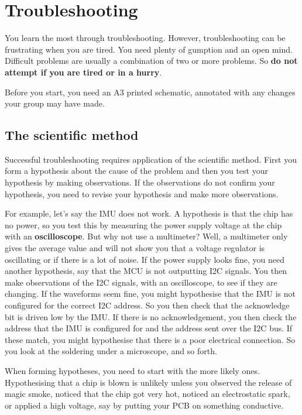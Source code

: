 \chapter{Troubleshooting}
\label{troubleshooting}

You learn the most through troubleshooting.  However, troubleshooting
can be frustrating when you are tired. You need plenty of gumption and
an open mind. Difficult problems are usually a combination of two or
more problems. So \textbf{do not attempt if you are tired or in a
  hurry}.

Before you start, you need an A3 printed schematic, annotated with
any changes your group may have made.


\section{The scientific method}

Successful troubleshooting requires application of the scientific
method.  First you form a hypothesis about the cause of the problem
and then you test your hypothesis by making observations.  If the
observations do not confirm your hypothesis, you need to revise your
hypothesis and make more observations.

For example, let's say the IMU does not work.  A hypothesis is that
the chip has no power, so you test this by measuring the power supply
voltage at the chip with an \textbf{oscilloscope}.  But why not use a
multimeter?  Well, a multimeter only gives the average value and will
not show you that a voltage regulator is oscillating or if there is a
lot of noise.  If the power supply looks fine, you need another
hypothesis, say that the MCU is not outputting I2C signals.  You then
make observations of the I2C signals, with an oscilloscope, to see if
they are changing.  If the waveforms seem fine, you might hypothesise
that the IMU is not configured for the correct I2C address.  So you
then check that the acknowledge bit is driven low by the IMU.  If
there is no acknowledgement, you then check the address that the IMU
is configured for and the address sent over the I2C bus.  If these
match, you might hypothesise that there is a poor electrical
connection.  So you look at the soldering under a microscope, and so
forth.

When forming hypotheses, you need to start with the more likely ones.
Hypothesising that a chip is blown is unlikely unless you observed the
release of magic smoke, noticed that the chip got very hot, noticed an
electrostatic spark, or applied a high voltage, say by putting your
PCB on something conductive.

